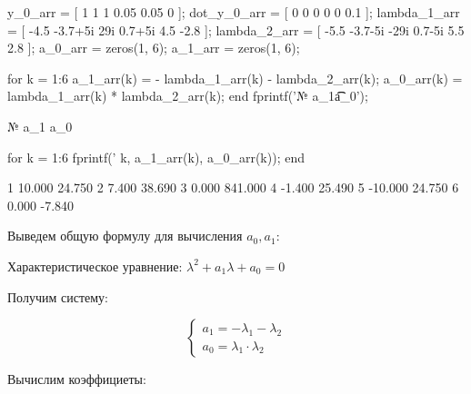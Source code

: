 


\begin{matlabcode}
y_0_arr = [ 1 1 1 0.05 0.05 0 ];
dot_y_0_arr = [ 0 0 0 0 0 0.1 ];
lambda_1_arr = [ -4.5 -3.7+5i 29i 0.7+5i 4.5 -2.8 ];
lambda_2_arr = [ -5.5 -3.7-5i -29i 0.7-5i 5.5 2.8 ];
a_0_arr = zeros(1, 6);
a_1_arr = zeros(1, 6);

for k = 1:6
    a_1_arr(k) = - lambda_1_arr(k) - lambda_2_arr(k);
    a_0_arr(k) = lambda_1_arr(k) * lambda_2_arr(k);
end
fprintf('№  a_1\t\t a_0\n');
\end{matlabcode}
\begin{matlaboutput}
№  a_1		 a_0
\end{matlaboutput}
\begin{matlabcode}
for k = 1:6
    fprintf('%
        k, a_1_arr(k), a_0_arr(k));
end
\end{matlabcode}
\begin{matlaboutput}
1  10.000	 24.750
2   7.400	 38.690
3   0.000	841.000
4  -1.400	 25.490
5 -10.000	 24.750
6   0.000	 -7.840
\end{matlaboutput}

\begin{par}
\begin{flushleft}
Выведем общую формулу для вычисления $a_0 ,a_1$:
\end{flushleft}
\end{par}

\begin{par}
\begin{flushleft}
Характеристическое уравнение: $\lambda^2 +a_1 \lambda +a_0 =0$
\end{flushleft}
\end{par}

\begin{par}
\begin{flushleft}
Получим систему:
\end{flushleft}
\end{par}

\begin{par}
$$\left\lbrace \begin{array}{c}
a_1 =-\lambda_1 -\lambda_2 \\
a_0 =\lambda_1 \cdot \lambda_2 
\end{array}\right.$$
\end{par}

\begin{par}
\begin{flushleft}
Вычислим коэффициеты:
\end{flushleft}
\end{par}


